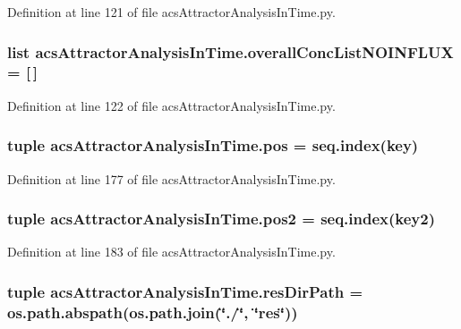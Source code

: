 Definition at line 121 of file acs\-Attractor\-Analysis\-In\-Time.\-py.

\hypertarget{a00097_ad7eab833592c6cd395f9e2416dd13920}{
\subsubsection[{overall\-Conc\-List\-N\-O\-I\-N\-F\-L\-U\-X}]{\setlength{\rightskip}{0pt plus 5cm}list acs\-Attractor\-Analysis\-In\-Time.\-overall\-Conc\-List\-N\-O\-I\-N\-F\-L\-U\-X = \mbox{[}$\,$\mbox{]}}}\label{a00097_ad7eab833592c6cd395f9e2416dd13920}


Definition at line 122 of file acs\-Attractor\-Analysis\-In\-Time.\-py.

\hypertarget{a00097_aa39692272363cd6f687c4b2a53f96594}{
\subsubsection[{pos}]{\setlength{\rightskip}{0pt plus 5cm}tuple acs\-Attractor\-Analysis\-In\-Time.\-pos = {\bf seq.\-index}(key)}}\label{a00097_aa39692272363cd6f687c4b2a53f96594}


Definition at line 177 of file acs\-Attractor\-Analysis\-In\-Time.\-py.

\hypertarget{a00097_a49fec7e1deea4728b5ef4a487d155de9}{
\subsubsection[{pos2}]{\setlength{\rightskip}{0pt plus 5cm}tuple acs\-Attractor\-Analysis\-In\-Time.\-pos2 = {\bf seq.\-index}(key2)}}\label{a00097_a49fec7e1deea4728b5ef4a487d155de9}


Definition at line 183 of file acs\-Attractor\-Analysis\-In\-Time.\-py.

\hypertarget{a00097_a28ca19f0f566396ef664e068a41a2837}{
\subsubsection[{res\-Dir\-Path}]{\setlength{\rightskip}{0pt plus 5cm}tuple acs\-Attractor\-Analysis\-In\-Time.\-res\-Dir\-Path = os.\-path.\-abspath(os.\-path.\-join(\char`\"{}./\char`\"{}, \char`\"{}res\char`\"{}))}}\label{a00097_a28ca19f0f566396ef664e068a41a2837}


